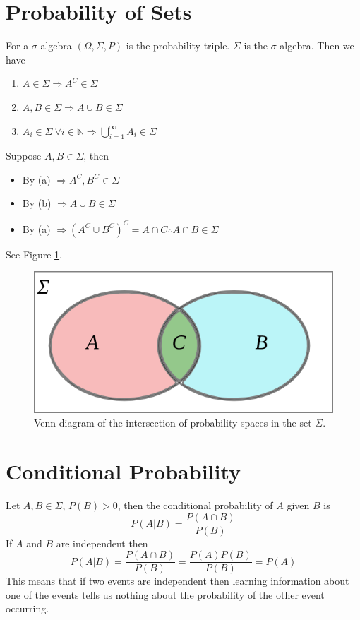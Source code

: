 
\mainmatter
\setcounter{page}{1}

\lectureseries[\course]{\course}

\date{October 6, 2009}

\setaddress

\setcounter{lecture}{2}
\setcounter{chapter}{2}


\section{Probability of Sets}
For a $\sigma$-algebra $(\Omega, \Sigma, P)$ is the probability triple. $\Sigma$ is the $\sigma$-algebra. Then we have
\begin{enumerate}
\item $A\in\Sigma \Rightarrow A^C\in\Sigma$
\item $A, B\in\Sigma \Rightarrow A\cup B\in\Sigma$
\item $A_i\in\Sigma ~\forall i\in\mathbb{N} \Rightarrow \bigcup_{i=1}^\infty A_i\in\Sigma$
\end{enumerate}
Suppose $A,B\in\Sigma$, then
\begin{itemize}
\item By (a) $\Rightarrow A^C,B^C\in\Sigma$
\item By (b) $\Rightarrow A\cup B\in\Sigma$
\item By (a) $\Rightarrow (A^C\cup B^C)^C = A\cap C \therefore A\cap B\in\Sigma$
\end{itemize}
See Figure \ref{fig:03vennProb}.
\begin{figure}[ht!]
	\centering
	\includegraphics[width=.5\textwidth]{images/03vennProb}
	\caption{Venn diagram of the intersection of probability spaces in the set $\Sigma$.}
	\label{fig:03vennProb}
\end{figure}

\section{Conditional Probability}
Let $A,B\in\Sigma$, $P(B)>0$, then the conditional probability of $A$ given $B$ is
$$P(A|B) = \frac{P(A\cap B)}{P(B)}$$
If $A$ and $B$ are independent then
$$P(A|B) = \frac{P(A\cap B)}{P(B)} = \frac{P(A)P(B)}{P(B)} = P(A)$$
This means that if two events are independent then learning information about one of the events tells us nothing about the probability of the other event occurring.

